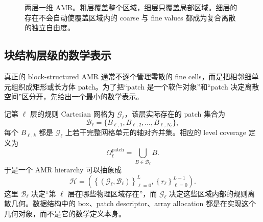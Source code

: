 \begin{figure}[htbp]
\centering
{}
\caption{两层一维 AMR。粗层覆盖整个区域，细层只覆盖局部区域。细层的存在不会自动使覆盖区域内的 coarse 与 fine values 都成为复合离散的独立自由度。}
\label{fig:amr-hierarchy-one-dimensional}
\end{figure}

\subsection{块结构层级的数学表示}

真正的 block-structured AMR 通常不逐个管理零散的 fine cells，而是把相邻细单元组织成矩形或长方体 patch。为了把“patch 是一个软件对象”和“patch 决定离散空间”区分开，先给出一个最小的数学表示。

记第 $\ell$ 层的规则 Cartesian 网格为 $\mathcal G_\ell$，该层实际存在的 patch 集合为
\begin{equation}
\mathcal B_\ell
=\{B_{\ell,1},B_{\ell,2},\ldots,B_{\ell,N_\ell}\},
\end{equation}
每个 $B_{\ell,k}$ 都是 $\mathcal G_\ell$ 上若干完整网格单元的轴对齐并集。相应的 level coverage 定义为
\begin{equation}
\Omega_\ell^{\mathrm{patch}}
=
\bigcup_{B\in\mathcal B_\ell} B.
\label{eq:amr-level-coverage}
\end{equation}
于是一个 AMR hierarchy 可以抽象成
\begin{equation}
\boxed{
\mathcal H
=
\left(
\left\{(\mathcal G_\ell,\mathcal B_\ell)\right\}_{\ell=0}^{L},
\left\{r_\ell\right\}_{\ell=0}^{L-1}
\right).
}
\label{eq:amr-hierarchy-definition}
\end{equation}
这里 $\mathcal B_\ell$ 决定“第 $\ell$ 层在哪些物理区域存在”，而 $\mathcal G_\ell$ 决定这些区域内部的规则离散几何。数据结构中的 box、patch descriptor、array allocation 都是在实现这个几何对象，而不是它的数学定义本身。

